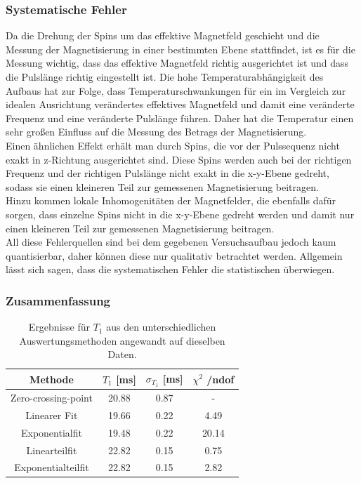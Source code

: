 \documentclass[12pt,a4paper]{article}
\begin{document}
\subsubsection{Systematische Fehler} 
Da die Drehung der Spins um das effektive Magnetfeld geschieht und die Messung der Magnetisierung in einer bestimmten Ebene stattfindet, ist es für die Messung wichtig, dass das effektive Magnetfeld richtig ausgerichtet ist und dass die Pulslänge richtig eingestellt ist. Die hohe Temperaturabhängigkeit des Aufbaus hat zur Folge, dass Temperaturschwankungen für ein im Vergleich zur idealen Ausrichtung verändertes effektives Magnetfeld und damit eine veränderte Frequenz und eine veränderte Pulslänge führen. Daher hat die Temperatur einen sehr großen Einfluss auf die Messung des Betrags der Magnetisierung. \\
Einen ähnlichen Effekt erhält man durch Spins, die vor der Pulssequenz nicht exakt in z-Richtung ausgerichtet sind. Diese Spins werden auch bei der richtigen Frequenz und der richtigen Pulslänge nicht exakt in die x-y-Ebene gedreht, sodass sie einen kleineren Teil zur gemessenen Magnetisierung beitragen. \\
Hinzu kommen lokale Inhomogenitäten der Magnetfelder, die ebenfalls dafür sorgen, dass einzelne Spins nicht in die x-y-Ebene gedreht werden und damit nur einen kleineren Teil zur gemessenen Magnetisierung beitragen.\\
All diese Fehlerquellen sind bei dem gegebenen Versuchsaufbau jedoch kaum quantisierbar, daher können diese nur qualitativ betrachtet werden. Allgemein lässt sich sagen, dass die systematischen Fehler die statistischen überwiegen.

\subsubsection{Zusammenfassung}

\begin{table}
\centering
\begin{tabular}{|c|c|c|c|}
\hline 
Methode & $T_1$ [ms] & $\sigma _{T_1}$ [ms] & $\chi ^2$ /ndof \\ 
\hline 
Zero-crossing-point & 20.88 & 0.87 & - \\ 
\hline 
Linearer Fit & 19.66 & 0.22 & 4.49 \\ 
\hline 
Exponentialfit & 19.48 & 0.22 & 20.14 \\ 
\hline
\hline
Linearteilfit &  22.82 & 0.15 & 0.75 \\
\hline
Exponentialteilfit &  22.82 & 0.15 & 2.82 \\
\hline
\end{tabular} 
\caption{Ergebnisse für $T_1$ aus den unterschiedlichen Auswertungsmethoden angewandt auf dieselben Daten.}
\label{tab:T1_Ergebnisse}
\end{table}
\end{document}
